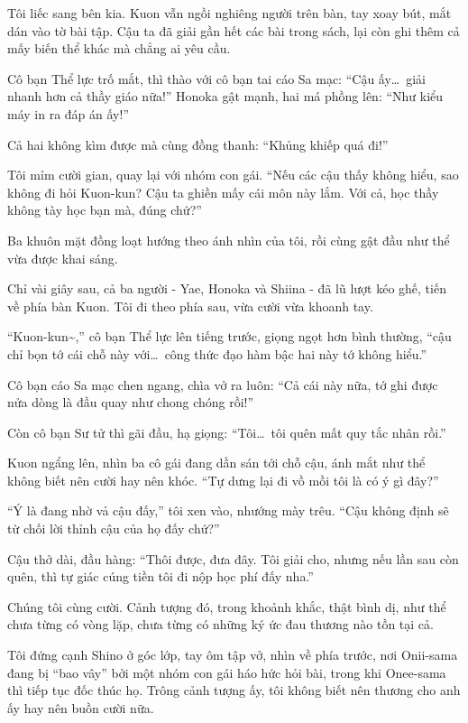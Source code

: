 \documentclass[../main.tex]{subfiles}
\begin{document}
Tôi liếc sang bên kia. Kuon vẫn ngồi nghiêng người trên bàn, tay xoay bút, mắt dán vào tờ bài tập. Cậu ta đã giải gần hết các bài trong sách, lại còn ghi thêm cả mấy biến thể khác mà chẳng ai yêu cầu.

Cô bạn Thể lực trố mắt, thì thào với cô bạn tai cáo Sa mạc: ``Cậu ấy\dots\ giải nhanh hơn cả thầy giáo nữa!'' Honoka gật mạnh, hai má phồng lên: ``Như kiểu máy in ra đáp án ấy!''

Cả hai không kìm được mà cùng đồng thanh: ``Khủng khiếp quá đi!''

Tôi mỉm cười gian, quay lại với nhóm con gái. ``Nếu các cậu thấy không hiểu, sao không đi hỏi Kuon-kun? Cậu ta ghiền mấy cái môn này lắm. Với cả, học thầy không tày học bạn mà, đúng chứ?''

Ba khuôn mặt đồng loạt hướng theo ánh nhìn của tôi, rồi cùng gật đầu như thể vừa được khai sáng.

Chỉ vài giây sau, cả ba người - Yae, Honoka và Shiina - đã lũ lượt kéo ghế, tiến về phía bàn Kuon. Tôi đi theo phía sau, vừa cười vừa khoanh tay.

``Kuon-kun\~{},'' cô bạn Thể lực lên tiếng trước, giọng ngọt hơn bình thường, ``cậu chỉ bọn tớ cái chỗ này với\dots\ công thức đạo hàm bậc hai này tớ không hiểu.''

Cô bạn cáo Sa mạc chen ngang, chìa vở ra luôn: ``Cả cái này nữa, tớ ghi được nửa dòng là đầu quay như chong chóng rồi!''

Còn cô bạn Sư tử thì gãi đầu, hạ giọng: ``Tôi\dots\ tôi quên mất quy tắc nhân rồi.''

Kuon ngẩng lên, nhìn ba cô gái đang dần sán tới chỗ cậu, ánh mắt như thể không biết nên cười hay nên khóc. ``Tự dưng lại đi vồ mồi tôi là có ý gì đây?''

``Ý là đang nhờ vả cậu đấy,'' tôi xen vào, nhướng mày trêu. ``Cậu không định sẽ từ chối lời thỉnh cậu của họ đấy chứ?''

Cậu thở dài, đầu hàng: ``Thôi được, đưa đây. Tôi giải cho, nhưng nếu lần sau còn quên, thì tự giác cúng tiền tôi đi nộp học phí đấy nha.''

Chúng tôi cùng cười. Cảnh tượng đó, trong khoảnh khắc, thật bình dị, như thể chưa từng có vòng lặp, chưa từng có những ký ức đau thương nào tồn tại cả.


Tôi đứng cạnh Shino ở góc lớp, tay ôm tập vở, nhìn về phía trước, nơi Onii-sama đang bị ``bao vây'' bởi một nhóm con gái háo hức hỏi bài, trong khi Onee-sama thì tiếp tục đốc thúc họ. Trông cảnh tượng ấy, tôi không biết nên thương cho anh ấy hay nên buồn cười nữa.
\end{document}
